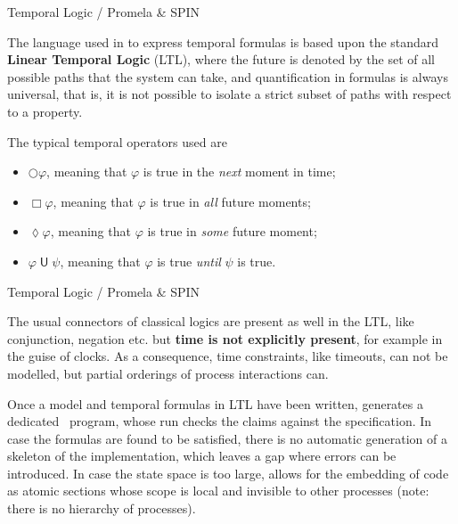 \documentclass[compress,dvips,xcolor={dvipsnames},t]{beamer}
\begin{document}
%
\begin{frame}{Temporal Logic / Promela \& SPIN}

  The language used in \SPIN to express temporal formulas is based
  upon the standard \textbf{Linear Temporal Logic} (LTL), where the
  future is denoted by the set of all possible paths that the system
  can take, and quantification in formulas is always universal, that
  is, it is not possible to isolate a strict subset of paths with
  respect to a property.

  \bigskip

  The typical temporal operators used are
  \begin{itemize}

    \item $\bigcirc \varphi$, meaning that $\varphi$ is true in the
      \emph{next} moment in time;

    \item $\Box \varphi$, meaning that $\varphi$ is true in \emph{all}
      future moments;

    \item $\lozenge \varphi$, meaning that $\varphi$ is true in
      \emph{some} future moment;

    \item $\varphi \mathrel{\textsf{U}} \psi$, meaning that $\varphi$
      is true \emph{until} $\psi$ is true.

  \end{itemize}

\end{frame}

%
\begin{frame}{Temporal Logic / Promela \& SPIN}

  The usual connectors of classical logics are present as well in the
  LTL, like conjunction, negation etc. but \textbf{time is not
    explicitly present}, for example in the guise of clocks. As a
  consequence, time constraints, like timeouts, can not be modelled,
  but partial orderings of process interactions can.

  \bigskip

  Once a \Promela model and temporal formulas in LTL have been
  written, \SPIN generates a dedicated \Clang~program, whose run
  checks the claims against the specification. In case the formulas
  are found to be satisfied, there is no automatic generation of a
  skeleton of the implementation, which leaves a gap where errors can
  be introduced. In case the state space is too large, \Promela allows
  for the embedding of \Clang code as atomic sections whose scope is
  local and invisible to other processes (note: there is no hierarchy
  of processes).

\end{frame}
\end{document}
